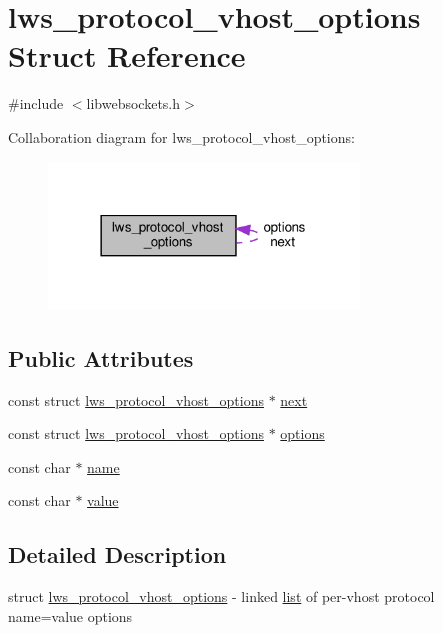\hypertarget{structlws__protocol__vhost__options}{}\section{lws\+\_\+protocol\+\_\+vhost\+\_\+options Struct Reference}
\label{structlws__protocol__vhost__options}


{\ttfamily \#include $<$libwebsockets.\+h$>$}



Collaboration diagram for lws\+\_\+protocol\+\_\+vhost\+\_\+options\+:
\nopagebreak
\begin{figure}[H]
\begin{center}
\leavevmode
\includegraphics[width=234pt]{structlws__protocol__vhost__options__coll__graph}
\end{center}
\end{figure}
\subsection*{Public Attributes}
\begin{DoxyCompactItemize}
\item 
const struct \hyperlink{structlws__protocol__vhost__options}{lws\+\_\+protocol\+\_\+vhost\+\_\+options} $\ast$ \hyperlink{structlws__protocol__vhost__options_ad7757018921b07c115404d76ff037fb4}{next}
\item 
const struct \hyperlink{structlws__protocol__vhost__options}{lws\+\_\+protocol\+\_\+vhost\+\_\+options} $\ast$ \hyperlink{structlws__protocol__vhost__options_a0c6c60ab43c6d5105c7d1d79cc399b05}{options}
\item 
const char $\ast$ \hyperlink{structlws__protocol__vhost__options_a551d9993c232c4366605769b9e9d5c31}{name}
\item 
const char $\ast$ \hyperlink{structlws__protocol__vhost__options_a6cd2a65b0689d306ef3ed019732439c0}{value}
\end{DoxyCompactItemize}


\subsection{Detailed Description}
struct \hyperlink{structlws__protocol__vhost__options}{lws\+\_\+protocol\+\_\+vhost\+\_\+options} -\/ linked \hyperlink{protocollist-p}{list} of per-\/vhost protocol name=value options

